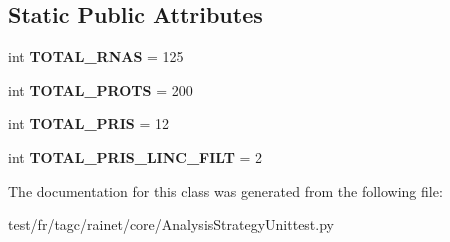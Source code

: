 \subsection*{Static Public Attributes}
\begin{DoxyCompactItemize}
\item 
\hypertarget{classAnalysisStrategyUnittest_1_1AnalysisStrategyUnittest_a112b9fc513a80c3c26fbdc231dffcacc}{int {\bfseries T\-O\-T\-A\-L\-\_\-\-R\-N\-A\-S} = 125}\label{classAnalysisStrategyUnittest_1_1AnalysisStrategyUnittest_a112b9fc513a80c3c26fbdc231dffcacc}

\item 
\hypertarget{classAnalysisStrategyUnittest_1_1AnalysisStrategyUnittest_a926a3a9a659bea4c2a7bcec302900704}{int {\bfseries T\-O\-T\-A\-L\-\_\-\-P\-R\-O\-T\-S} = 200}\label{classAnalysisStrategyUnittest_1_1AnalysisStrategyUnittest_a926a3a9a659bea4c2a7bcec302900704}

\item 
\hypertarget{classAnalysisStrategyUnittest_1_1AnalysisStrategyUnittest_a256a143b9bc3a7e0524349df0f080fa6}{int {\bfseries T\-O\-T\-A\-L\-\_\-\-P\-R\-I\-S} = 12}\label{classAnalysisStrategyUnittest_1_1AnalysisStrategyUnittest_a256a143b9bc3a7e0524349df0f080fa6}

\item 
\hypertarget{classAnalysisStrategyUnittest_1_1AnalysisStrategyUnittest_ae69f2e97a4dedf9acf06fcddd5c08f6b}{int {\bfseries T\-O\-T\-A\-L\-\_\-\-P\-R\-I\-S\-\_\-\-L\-I\-N\-C\-\_\-\-F\-I\-L\-T} = 2}\label{classAnalysisStrategyUnittest_1_1AnalysisStrategyUnittest_ae69f2e97a4dedf9acf06fcddd5c08f6b}

\end{DoxyCompactItemize}


The documentation for this class was generated from the following file\-:\begin{DoxyCompactItemize}
\item 
test/fr/tagc/rainet/core/Analysis\-Strategy\-Unittest.\-py\end{DoxyCompactItemize}
